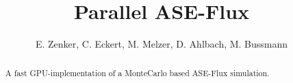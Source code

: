 \documentclass[a4paper,11pt, twocolumn]{article}
\title{Parallel ASE-Flux}
\author{E. Zenker, C. Eckert, M. Melzer, D. Ahlbach, M. Bussmann}
\begin{document}
\maketitle
\begin{abstract}
A fast GPU-implementation of a MonteCarlo based ASE-Flux simulation.
\end{abstract}





		
\end{document}
